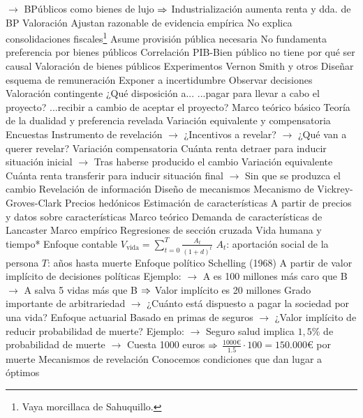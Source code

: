\documentclass{nuevotema}
\begin{document}
\begin{esquemal}
				\4[] $\to$ BPúblicos como bienes de lujo
				\4[] $\Rightarrow$ Industrialización aumenta renta y dda. de BP
				\4 Valoración
				\4[] Ajustan razonable de evidencia empírica
				\4[] No explica consolidaciones fiscales\footnote{Vaya morcillaca de Sahuquillo.}
				\4[] Asume provisión pública necesaria
				\4[] No fundamenta preferencia por bienes públicos
				\4[] Correlación PIB-Bien público no tiene por qué ser causal
		\2 Valoración de bienes públicos
			\3 Experimentos
				\4 Vernon Smith y otros
				\4 Diseñar esquema de remuneración
				\4 Exponer a incertidumbre
				\4 Observar decisiones
			\3 Valoración contingente
				\4 ¿Qué disposición a...
				\4[] ...pagar para llevar a cabo el proyecto?
				\4[] ...recibir a cambio de aceptar el proyecto?
				\4 Marco teórico básico
				\4[] Teoría de la dualidad y preferencia revelada
				\4[] Variación equivalente y compensatoria
				\4 Encuestas
				\4[] Instrumento de revelación
				\4[] $\to$ ¿Incentivos a revelar?
				\4[] $\to$ ¿Qué van a querer revelar?
				\4 Variación compensatoria
				\4[] Cuánta renta detraer para inducir situación inicial
				\4[] $\to$ Tras haberse producido el cambio
				\4 Variación equivalente
				\4[] Cuánta renta transferir para inducir situación final
				\4[] $\to$ Sin que se produzca el cambio
				\4 Revelación de información
				\4[] Diseño de mecanismos
				\4[] Mecanismo de Vickrey-Groves-Clark
			\3 Precios hedónicos
				\4 Estimación de características
				\4[] A partir de precios y datos sobre características
				\4 Marco teórico
				\4[] Demanda de características de Lancaster
				\4 Marco empírico
				\4[] Regresiones de sección cruzada
			\3 Vida humana y tiempo*
				\4 Enfoque contable
				\4[] $V_\text{vida} = \sum_{t=0}^T \frac{A_t}{(1+d)^t}$
				\4[] $A_t$: aportación social de la persona
				\4[] $T$: años hasta muerte
				\4 Enfoque político
				\4[] Schelling (1968)
				\4[] A partir de valor implícito de decisiones políticas
				\4[] Ejemplo:
				\4[] $\to$ A es 100 millones más caro que B
				\4[] $\to$ A salva 5 vidas más que B
				\4[] $\Rightarrow$ Valor implícito es 20 millones
				\4[] Grado importante de arbitrariedad
				\4[] $\to$ ¿Cuánto está dispuesto a pagar la sociedad por una vida?
				\4 Enfoque actuarial
				\4[] Basado en primas de seguros
				\4[] $\to$ ¿Valor implícito de reducir probabilidad de muerte?
				\4[] Ejemplo:
				\4[] $\to$ Seguro salud implica $1,5\%$ de probabilidad de muerte
				\4[] $\to$ Cuesta 1000 euros
				\4[] $\Rightarrow$ $\frac{1000 €}{1.5}\cdot 100=150.000 €$ por muerte
			\3 Mecanismos de revelación
				\4 Conocemos condiciones que dan lugar a óptimos

\end{esquemal}
\end{document}
